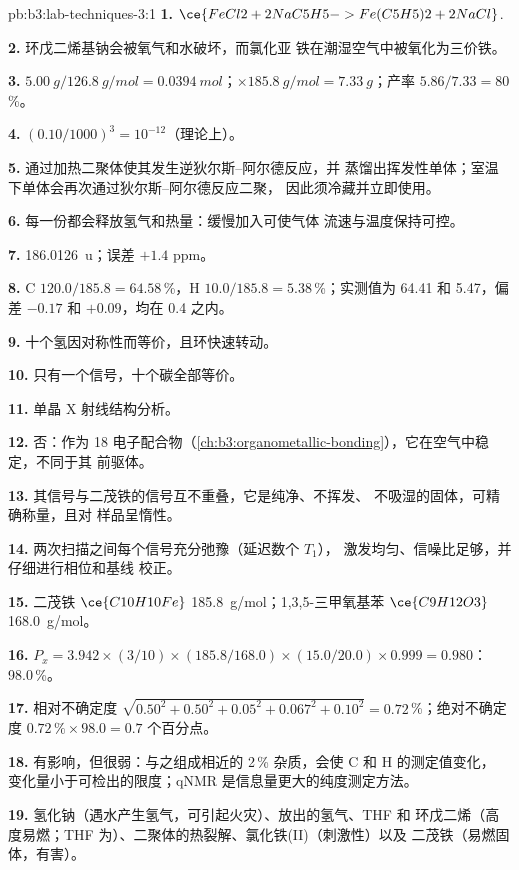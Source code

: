 \begin{solution}{pb:b3:lab-techniques-3:1}
\textbf{1.} $\ce{FeCl2 + 2NaC5H5 -> Fe(C5H5)2 + 2NaCl}$.

\textbf{2.} 环戊二烯基钠会被氧气和水破坏，而氯化亚
铁在潮湿空气中被氧化为三价铁。

\textbf{3.} $\qty{5.00}{g}/\qty{126.8}{g/mol} = \qty{0.0394}{mol}$；$\times \qty{185.8}{g/mol} = \qty{7.33}{g}$；产率 $5.86/7.33 = 80$\,\%。

\textbf{4.} $(0.10/1000)^3 = 10^{-12}$（理论上）。

\textbf{5.} 通过加热二聚体使其发生逆狄尔斯–阿尔德反应，并
蒸馏出挥发性单体；室温下单体会再次通过狄尔斯–阿尔德反应二聚，
因此须冷藏并立即使用。

\textbf{6.} 每一份都会释放氢气和热量：缓慢加入可使气体
流速与温度保持可控。

\textbf{7.} \qty{186.0126}{u}；误差 $+1.4$ ppm。

\textbf{8.} C $120.0/185.8 = 64.58$\,\%，H $10.0/185.8 = 5.38$\,\%；实测值为 64.41 和 5.47，偏差 $-0.17$ 和 $+0.09$，均在 0.4 之内。

\textbf{9.} 十个氢因对称性而等价，且环快速转动。

\textbf{10.} 只有一个信号，十个碳全部等价。

\textbf{11.} 单晶 X 射线结构分析。

\textbf{12.} 否：作为 18 电子配合物（\cref{ch:b3:organometallic-bonding}），它在空气中稳定，不同于其
前驱体。

\textbf{13.} 其信号与二茂铁的信号互不重叠，它是纯净、不挥发、
不吸湿的固体，可精确称量，且对
样品呈惰性。

\textbf{14.} 两次扫描之间每个信号充分弛豫（延迟数个 $T_1$），
激发均匀、信噪比足够，并仔细进行相位和基线
校正。

\textbf{15.} 二茂铁 $\ce{C10H10Fe}$ \qty{185.8}{g/mol}；1,3,5-三甲氧基苯 $\ce{C9H12O3}$ \qty{168.0}{g/mol}。

\textbf{16.} $P_x = 3.942 \times (3/10) \times (185.8/168.0) \times (15.0/20.0) \times 0.999 = 0.980$：98.0\,\%。

\textbf{17.} 相对不确定度 $\sqrt{0.50^2 + 0.50^2 + 0.05^2 + 0.067^2 + 0.10^2} = 0.72$\,\%；绝对不确定度 $0.72\,\% \times 98.0 = 0.7$ 个百分点。

\textbf{18.} 有影响，但很弱：与之组成相近的 2\,\% 杂质，会使 C 和 H 的测定值变化，
变化量小于可检出的限度；qNMR 是信息量更大的纯度测定方法。

\textbf{19.} 氢化钠（遇水产生氢气，可引起火灾）、放出的氢气、THF 和
环戊二烯（高度易燃；THF 为）、二聚体的热裂解、氯化铁(II)（刺激性）以及
二茂铁（易燃固体，有害）。


\end{solution}
